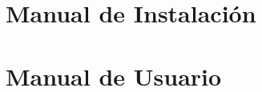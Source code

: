 \documentclass[12pt, a4paper, twoside]{article}
\begin{document}
%


\nocite{*}
\printbibliography

\newpage

\begin{umaappendices}
  \section{Manual de Instalación}
  
  
  \section{Manual de Usuario}
  

\end{umaappendices}


\end{document}
